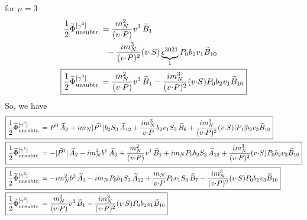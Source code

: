 \documentclass[]{article}
\numberwithin{equation}{section}
\newcommand{\tcdot}{{\cdot}}
\newcommand{\tAmp}{\widetilde{A}}
\newcommand{\tBmp}{\widetilde{B}}
\newcommand{\bvec}{b}
\newcommand{\mN}{m_N}
\newcommand{\unsub}{\text{unsubtr.}}
\begin{document}
for $\mu=3$
\begin{align}
    \frac{1}{2}\widetilde \Phi^{[\gamma^3]}_{\unsub} & = \frac{\mN^2}{(v \tcdot P)} v^3\, \tBmp_1 
		\nonumber \\ &
		~~
		- \frac{i \mN^3}{(v \tcdot P)^2} (v \tcdot S) \underbrace{\epsilon^{3 0 2 1}}_{1} P_0 \bvec_2 v_1 \tBmp_{10}\\
  \Aboxed{\frac{1}{2}\widetilde \Phi^{[\gamma^3]}_{\unsub}& = \frac{\mN^2}{(v \tcdot P)} v^3\, \tBmp_1- \frac{i \mN^3}{(v \tcdot P)^2} (v \tcdot S)  P_0 \bvec_2 v_1 \tBmp_{10}}
\end{align}
So, we have
\begin{align}
   \Aboxed{ \frac{1}{2}\widetilde \Phi^{[\gamma^{0}]}_{\unsub}& = P^0\, \tAmp_2  + i \mN  |\vec{P}^1| \bvec_2 S_3\, \tAmp_{12}+ \frac{ i \mN^3}{v \tcdot P}  \bvec_2 v_1 S_3\, \tBmp_8+ \frac{i \mN^3}{(v \tcdot P)^2} (v \tcdot S)  |P_1| \bvec_2 v_3 \tBmp_{10}}\\
   \Aboxed{ \frac{1}{2}\widetilde \Phi^{[\gamma^{1}]}_{\unsub} & =-|\vec{P}^1|\, \tAmp_2- i \mN^2 \bvec^1\, \tAmp_3+ \frac{\mN^2}{(v \tcdot P)} v^1\, \tBmp_1 
		+ i \mN  P_0 \bvec_2 S_3\, \tAmp_{12}+ \frac{i \mN^3}{(v \tcdot P)^2} (v \tcdot S)  P_0 \bvec_2 v_3 \tBmp_{10}}\\
   \Aboxed{\frac{1}{2}\widetilde \Phi^{[\gamma^2]}_{\unsub} & =- i \mN^2 \bvec^2\, \tAmp_3
		- i \mN  P_0 \bvec_1 S_3\, \tAmp_{12}+ \frac{\mN}{v \tcdot P}  P_0 v_1 S_3\, \tBmp_7- \frac{i \mN^3}{(v \tcdot P)^2} (v \tcdot S) P_0 \bvec_1 v_3 \tBmp_{10}}\\
    \Aboxed{\frac{1}{2}\widetilde \Phi^{[\gamma^3]}_{\unsub}& = \frac{\mN^2}{(v \tcdot P)} v^3\, \tBmp_1- \frac{i \mN^3}{(v \tcdot P)^2} (v \tcdot S)  P_0 \bvec_2 v_1 \tBmp_{10}}
\end{align}
\end{document}
